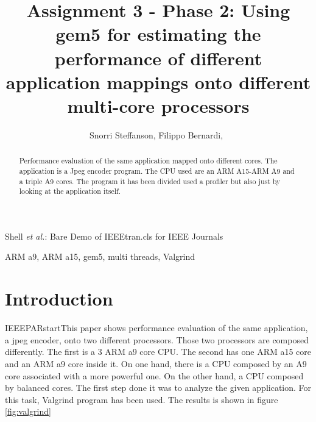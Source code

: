 \documentclass[journal]{IEEEtran}
\begin{document}
\title{Assignment 3 - Phase 2: Using gem5 for estimating the performance of different application mappings onto different multi-core processors
}

\author{Snorri Steffanson, Filippo Bernardi,~
}



%
{Shell \MakeLowercase{\textit{et al.}}: Bare Demo of IEEEtran.cls for IEEE Journals}


\maketitle

\begin{abstract}
Performance evaluation of the same application mapped onto different cores. The application is a Jpeg encoder program. The CPU used are an ARM A15-ARM A9 and a triple A9 cores. The program it has been divided used a profiler but also just by looking at the application itself. 
\end{abstract}

\begin{IEEEkeywords}
ARM a9, ARM a15, gem5, multi threads, Valgrind 
\end{IEEEkeywords}




\IEEEpeerreviewmaketitle



\section{Introduction}

IEEEPARstart{T}{his} paper shows performance evaluation of the same application, a jpeg encoder, onto two different processors. Those two processors are composed differently. The first is a 3 ARM a9 core CPU. The second has one ARM a15 core and an ARM a9 core inside it.
On one hand, there is a CPU composed by an A9 core associated with a more powerful one. On the other hand, a CPU composed by balanced cores.
The first step done it was to analyze the given application. For this task, Valgrind program has been used.
The results is shown in figure \ref{fig:valgrind}
\end{document}
